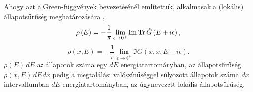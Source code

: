 Ahogy azt a Green-függvények bevezetésénél említettük, alkalmasak a (lokális) állapotsűrűség meghatározására \cite[7. o.]{economou2006green},
\begin{equation}
	\rho\left(E\right) = -\frac{1}{\pi}\lim_{\epsilon \to 0^+} \operatorname{Im}\operatorname{Tr}\hat{G}\left(E + i\epsilon\right),
	\label{green:densityeq}
\end{equation}
\begin{equation}
	\rho(x,E)=-\frac{1}{\pi}\lim_{\epsilon\to 0^+}\Im G(x,x,E+i\epsilon).
	\label{green:localdensityeq}
\end{equation}
$\rho(E)\,dE$ az állapotok száma egy $dE$ energiatartományban, az állapotsűrűség. $\rho(x,E)\,dE\,dx$ pedig a megtalálási valószínűséggel súlyozott állapotok száma $dx$ intervallumban $dE$ energiatartományban, az úgynevezett lokális állapotsűrűség.

